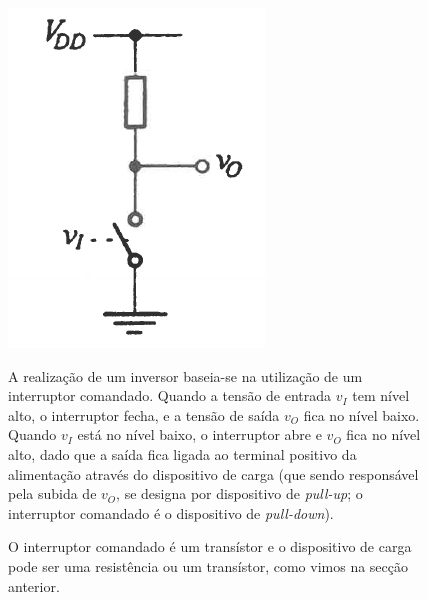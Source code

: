 \begin{figure}[H]
    \centering
    \begin{minipage}[t]{0.16\linewidth}\vspace{0pt}%
        \includegraphics[width=\linewidth]{img/5/inverter.png}
        \caption{}
        \label{fig:inverter}
    \end{minipage}\hfill
    \begin{minipage}[t]{0.82\linewidth}\vspace{0pt}%
        A realização de um inversor baseia-se na utilização de um interruptor comandado. Quando a tensão de entrada $v_I$ tem nível alto, o interruptor fecha, e a tensão de saída $v_O$ fica no nível baixo. Quando $v_I$ está no nível baixo, o interruptor abre e $v_O$ fica no nível alto, dado que a saída fica ligada ao terminal positivo da alimentação através do dispositivo de carga (que sendo responsável pela subida de $v_O$, se designa por dispositivo de \textit{pull-up}; o interruptor comandado é o dispositivo de \textit{pull-down}).

        O interruptor comandado é um transístor e o dispositivo de carga pode ser uma resistência ou um transístor, como vimos na secção anterior.
    \end{minipage}
\end{figure}

